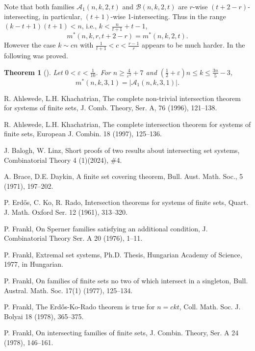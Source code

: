 \documentclass[11pt,a4paper]{article}
\newtheorem{thm}{Theorem}[section]
\newtheorem{false statement}{False statement}
\theoremstyle{definition}
\def\ha{\mathcal{A}}
\def\hb{\mathcal{B}}
\begin{document}
Note that both families $\ha_1(n,k,2,t)$ and $\hb(n,k,2,t)$ are $r$-wise $(t+2-r)$-intersecting, in particular, $(t+1)$-wise 1-intersecting. Thus in the range $(k-t+1)(t+1)<n$, i.e.,
$k<\frac{n}{t+1}+t-1$,
\[
m^*(n,k,r,t+2-r) =m^*(n,k,2,t).
\]
However the case $k\sim cn$ with $\frac{1}{t+1}<c<\frac{r-1}{r}$
 appears to be much harder. In \cite{FW} the following was proved.

\begin{thm}[\cite{FW}]
Let $0<\varepsilon<\frac{1}{10}$. For $n\geq \frac{4}{\varepsilon^2}+7$ and  $\left(\frac{1}{2}+\varepsilon \right)n\leq k\leq \frac{3n}{5}-3$,
\[
m^*(n,k,3,1) = |\ha_1(n,k,3,1)|.
\]
\end{thm}





\begin{thebibliography}{10}

R. Ahlswede, L.H. Khachatrian, The complete non-trivial intersection theorem for systems of finite sets,  J. Comb. Theory, Ser. A,  76 (1996), 121--138.

R. Ahlswede, L.H. Khachatrian,  The complete intersection theorem for systems of finite sets, European J. Combin. 18 (1997), 125--136.


J. Balogh, W. Linz, Short proofs of two results about intersecting set systems, Combinatorial Theory 4 (1)(2024), \#4.

A. Brace, D.E. Daykin, A finite set covering theorem,  Bull. Aust. Math. Soc.,  5 (1971), 197--202.

 P. Erd\H{o}s, C. Ko, R. Rado, Intersection theorems for systems of finite sets, Quart. J. Math. Oxford Ser. 12 (1961), 313--320.

    P. Frankl, On Sperner families satisfying an additional condition, J. Combinatorial Theory Ser. A 20 (1976), 1--11.

P. Frankl, Extremal set systems, Ph.D. Thesis, Hungarian Academy of Science, 1977, in Hungarian.

P. Frankl, On families of finite sets no two of which intersect in a singleton, Bull. Austral. Math. Soc. 17(1) (1977), 125--134.

  P. Frankl, The Erd\H{o}s-Ko-Rado theorem is true for $n = ckt$,  Coll. Math. Soc. J. Bolyai 18 (1978), 365--375.

P. Frankl, On intersecting families of finite sets, J. Combin. Theory, Ser. A 24 (1978), 146--161.


\end{thebibliography}
\end{document}
